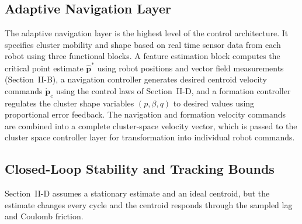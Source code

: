 \documentclass[lettersize,journal]{IEEEtran}
\begin{document}
\subsection{Adaptive Navigation Layer}

The adaptive navigation layer is the highest level of the control architecture. It specifies cluster mobility and shape based on real time sensor data from each robot using three functional blocks. A feature estimation block computes the critical point estimate $\hat{\mathbf{p}}^*$ using robot positions and vector field measurements (Section~II-B), a navigation controller generates desired centroid velocity commands $\dot{\mathbf{p}}_c$ using the control laws of Section~II-D, and a formation controller regulates the cluster shape variables $(p, \beta, q)$ to desired values using proportional error feedback. The navigation and formation velocity commands are combined into a complete cluster-space velocity vector, which is passed to the cluster space controller layer for transformation into individual robot commands.

\subsection{Closed-Loop Stability and Tracking Bounds}
\label{sec:stability}

Section~II-D assumes a stationary estimate and an ideal centroid, but the estimate changes every cycle and the centroid responds through the sampled lag and Coulomb friction.
\end{document}
